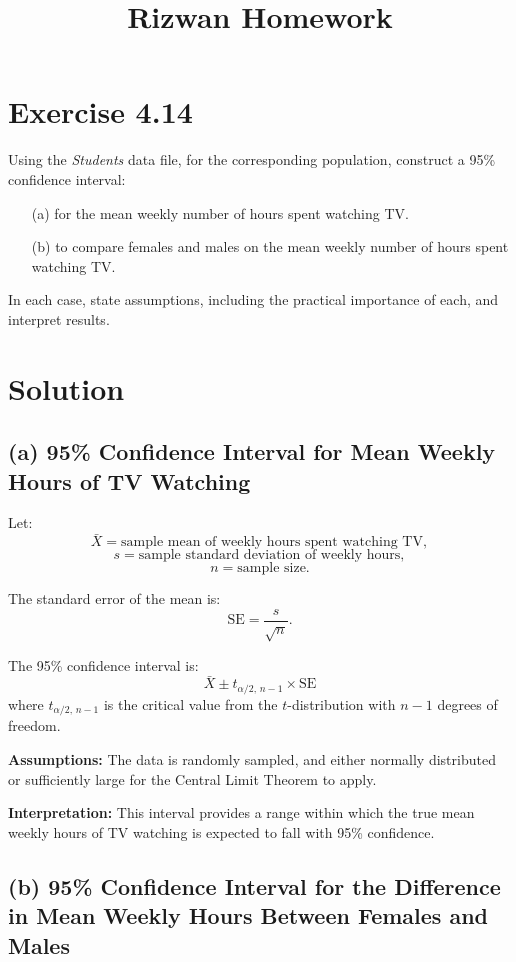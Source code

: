 \documentclass{article}
\begin{document}
\title{Rizwan Homework }
\author{}
\date{}
\maketitle

\section*{Exercise 4.14}

Using the \textit{Students} data file, for the corresponding population, construct a 95\% confidence interval:
\begin{enumerate}
    \item[(a)] for the mean weekly number of hours spent watching TV.
    \item[(b)] to compare females and males on the mean weekly number of hours spent watching TV.
\end{enumerate}

In each case, state assumptions, including the practical importance of each, and interpret results.

\section*{Solution}

\subsection*{(a) 95\% Confidence Interval for Mean Weekly Hours of TV Watching}

Let:
\[
\bar{X} = \text{sample mean of weekly hours spent watching TV},
\]
\[
s = \text{sample standard deviation of weekly hours},
\]
\[
n = \text{sample size}.
\]

The standard error of the mean is:
\[
\text{SE} = \frac{s}{\sqrt{n}}.
\]

The 95\% confidence interval is:
\[
\bar{X} \pm t_{\alpha/2, \, n-1} \times \text{SE}
\]
where \( t_{\alpha/2, \, n-1} \) is the critical value from the \( t \)-distribution with \( n-1 \) degrees of freedom.

\textbf{Assumptions:} The data is randomly sampled, and either normally distributed or sufficiently large for the Central Limit Theorem to apply.

\textbf{Interpretation:} This interval provides a range within which the true mean weekly hours of TV watching is expected to fall with 95\% confidence.

\subsection*{(b) 95\% Confidence Interval for the Difference in Mean Weekly Hours Between Females and Males}
\end{document}
